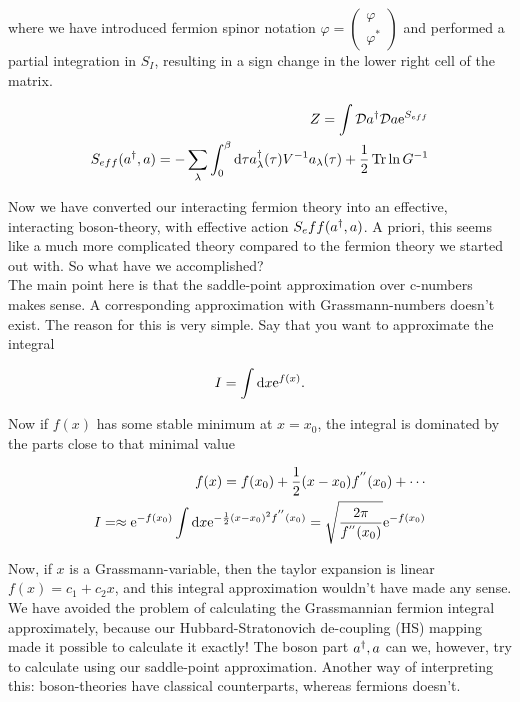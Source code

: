where we have introduced fermion spinor notation $\varphi = \begin{pmatrix} \varphi \\ \varphi^* \end{pmatrix}$ and performed a partial integration in $S_I$, resulting in a sign change in the lower right cell of the matrix. 

\begin{align*}
    Z = \int \mathcal{D} a^{\dagger} \mathcal{D} a \mathrm{e}^{S_{eff}} \\ 
    S_{eff}(a^{\dagger}, a) = -\sum_\lambda \int_{0}^{\beta} \dd \tau a^{\dagger}_\lambda(\tau) V^{-1} a_\lambda(\tau) + \frac{1}{2}\Tr \ln G^{-1} 
\end{align*}

Now we have converted our interacting fermion theory into an effective, interacting boson-theory, with effective action $S_eff(a^{\dagger}, a)$. A priori, this seems like a much more complicated theory compared to the fermion theory we started out with. So what have we accomplished? \\ 

The main point here is that the saddle-point approximation over c-numbers makes sense. A corresponding approximation with Grassmann-numbers doesn't exist. The reason for this is very simple. Say that you want to approximate the integral 

\begin{equation*}
    I = \int \dd x \mathrm{e}^{f(x)}.
\end{equation*}

Now if $f(x)$ has some stable minimum at $x = x_0$, the integral is dominated by the parts close to that minimal value

\begin{align*}
    f(x) = f(x_0) + \frac{1}{2}(x-x_0)f^{''}(x_0) + \cdots \\ 
    I = \approx \mathrm{e}^{-f(x_0)}\int \dd x \mathrm{e}^{-\frac{1}{2}(x - x_0)^{2} f^{''}(x_0)} = \sqrt{\frac{2\pi}{f^{''}(x_0)}}\mathrm{e}^{-f(x_0)}
\end{align*}

Now, if $x$ is a Grassmann-variable, then the taylor expansion is linear $f(x) = c_1 + c_2 x$, and this integral approximation wouldn't have made any sense. We have avoided the problem of calculating the Grassmannian fermion integral approximately, because our Hubbard-Stratonovich de-coupling (HS) mapping made it possible to calculate it exactly! The boson part $a^{\dagger}, a$ can we, however, try to calculate using our saddle-point approximation. Another way of interpreting this: boson-theories have classical counterparts, whereas fermions doesn't. 

